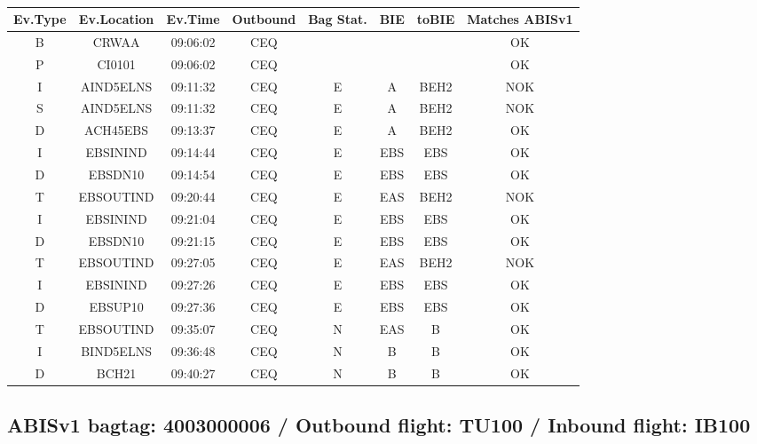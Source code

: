 \documentclass{report}
\begin{document}
\paragraph{}
\begin{longtable}{cccccccc}    \toprule
\rowcolor{white!50}
\textbf{Ev.Type} & \textbf{Ev.Location} & \textbf{Ev.Time} & \textbf{Outbound} & \textbf{Bag Stat.} & \textbf{BIE} & \textbf{toBIE} & \textbf{Matches ABISv1} \\\midrule
B & CRWAA & 09:06:02  & CEQ &  &  &  & OK\\
P & CI0101 & 09:06:02  & CEQ &  &  &  & OK\\
I & AIND5ELNS & 09:11:32  & CEQ & E & A & BEH2 & NOK\\
S & AIND5ELNS & 09:11:32  & CEQ & E & A & BEH2 & NOK\\
D & ACH45EBS & 09:13:37  & CEQ & E & A & BEH2 & OK\\
I & EBSININD & 09:14:44  & CEQ & E & EBS & EBS & OK\\
D & EBSDN10 & 09:14:54  & CEQ & E & EBS & EBS & OK\\
T & EBSOUTIND & 09:20:44  & CEQ & E & EAS & BEH2 & NOK\\
I & EBSININD & 09:21:04  & CEQ & E & EBS & EBS & OK\\
D & EBSDN10 & 09:21:15  & CEQ & E & EBS & EBS & OK\\
T & EBSOUTIND & 09:27:05  & CEQ & E & EAS & BEH2 & NOK\\
I & EBSININD & 09:27:26  & CEQ & E & EBS & EBS & OK\\
D & EBSUP10 & 09:27:36  & CEQ & E & EBS & EBS & OK\\
T & EBSOUTIND & 09:35:07  & CEQ & N & EAS & B & OK\\
I & BIND5ELNS & 09:36:48  & CEQ & N & B & B & OK\\
D & BCH21 & 09:40:27  & CEQ & N & B & B & OK\\
\bottomrule
\end{longtable}
\subsection*{ABISv1 bagtag: 4003000006 / Outbound flight: TU100 / Inbound flight: IB100}
\end{document}
